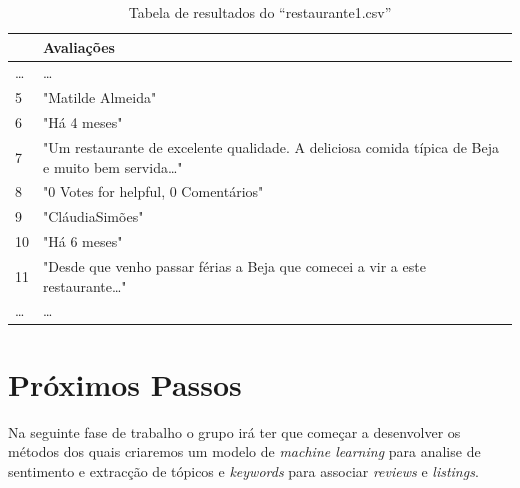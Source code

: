 \documentclass[a4paper,10pt]{article}
\begin{document}
\begin{table}[!ht]
  \centering
  \begin{adjustbox}{width=\columnwidth,center}
    \begin{tabular}{|l|l|}
      \hline
      ~      & Avaliações                                                                                           \\ \hline
      \ldots & \ldots                                                                                               \\ \hline
      5      & "Matilde Almeida"                                                                                    \\ \hline
      6      & "Há 4 meses"                                                                                         \\ \hline
      7      & "Um restaurante de excelente qualidade. A deliciosa comida típica de Beja e muito bem servida\ldots" \\ \hline
      8      & "0 Votes for helpful, 0 Comentários"                                                                 \\ \hline
      9      & "CláudiaSimões"                                                                                      \\ \hline
      10     & "Há 6 meses"                                                                                         \\ \hline
      11     & "Desde que venho passar férias a Beja que comecei a vir a este restaurante\ldots"                    \\ \hline
      \ldots & \ldots                                                                                               \\ \hline
    \end{tabular}
  \end{adjustbox}
  \caption{Tabela de resultados do ``restaurante1.csv''}
\end{table}

\newpage

\section{Próximos Passos}

Na seguinte fase de trabalho o grupo irá ter que começar a desenvolver os métodos dos quais criaremos um modelo de \textit{machine learning} para analise de sentimento e extracção de tópicos e \textit{keywords} para associar \textit{reviews} e \textit{listings}.
\end{document}
